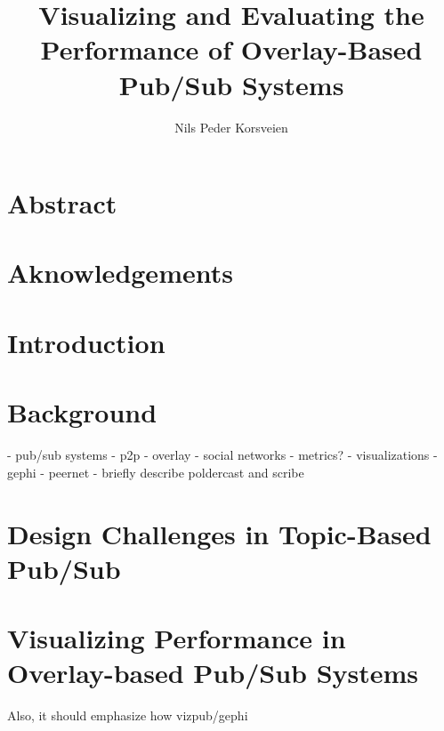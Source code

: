 \documentclass[UKenglish, a4paper]{ifimaster}
\title{Visualizing and Evaluating the Performance of Overlay-Based Pub/Sub Systems}
\subtitle{}
\author{Nils Peder Korsveien}
\begin{document}
\ififorside{}
\frontmatter{}
\maketitle{}

\chapter*{Abstract}
\tableofcontents{}
\listoffigures{}
\listoftables{}
\chapter*{Aknowledgements}
\mainmatter{}

\chapter{Introduction}


\chapter{Background}
- pub/sub systems
- p2p
- overlay
- social networks
- metrics?
- visualizations
- gephi
- peernet
- briefly describe poldercast and scribe

\label{ch:background}


\chapter{Design Challenges in Topic-Based Pub/Sub}
\label{ch:design-challenges}


\chapter{Visualizing Performance in Overlay-based Pub/Sub Systems}
 Also, it should emphasize how vizpub/gephi
\label{ch:vizpub}

\end{document}

